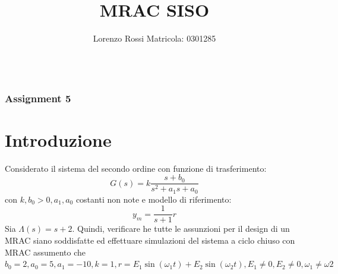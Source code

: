 \documentclass{beamer}
\title[Assignments 5]{MRAC SISO}
\author{Lorenzo Rossi Matricola: 0301285}
\begin{document}
\begin{frame}
	\titlepage{}
\end{frame}
\begin{frame}
	\begin{columns}[t]
		\begin{column}{.5\textwidth}
			\tableofcontents[sections={1-3}] %
		\end{column}
		\hspace{-1cm}
		\begin{column}{.5\textwidth}
			\tableofcontents[sections={4-5}] %
		\end{column}
	\end{columns}
\end{frame}
\begin{frame}
	\frametitle{Assignment 5}
	\section{Introduzione}
	Considerato il sistema del secondo ordine con funzione di trasferimento:\begin{equation}
        G(s)=k\frac{s+b_{0}}{s^{2}+a_{1}s+a_{0}}
    \end{equation}
    con \(k,b_{0}>0,a_{1},a_{0}\) costanti non note e modello di riferimento:\begin{equation}
        y_{m}=\frac{1}{s+1}r
    \end{equation}
    Sia \(\Lambda(s)=s+2\). Quindi, verificare he tutte le assunzioni per il design di un MRAC siano soddisfatte ed effettuare simulazioni del sistema a ciclo chiuso con MRAC assumento che \(b_{0}=2,a_{0}=5,a_{1}=-10,k=1,r=E_{1}\sin{(\omega_{1}t)}+E_{2}\sin{(\omega_{2}t)}, E_{1}\neq 0,E_{2}\neq 0, \omega_{1}\neq\omega{2} \)
\end{frame}
\end{document}

